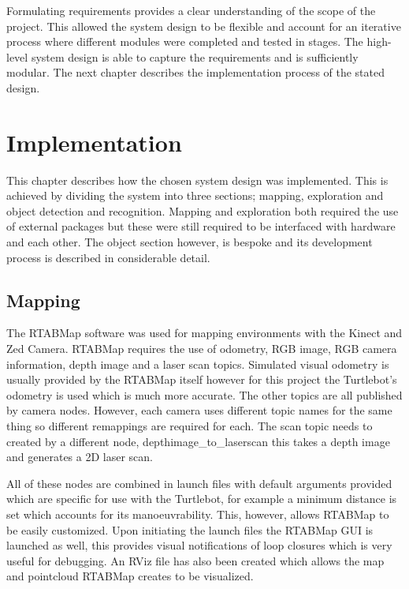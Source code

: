 \documentclass{mproj}
\begin{document}
Formulating requirements provides a clear understanding of the scope of the project. This allowed the system design to be flexible and account for an iterative process where different modules were  completed and tested in stages. The high-level system design is able to capture the requirements and is sufficiently modular. The next chapter describes the implementation process of the stated design.


\chapter{Implementation}

This chapter describes how the chosen system design was implemented. This is  achieved by dividing the system into three sections; mapping, exploration and object detection and recognition. Mapping and exploration both required the use of external packages but these were still required to be interfaced with hardware and each other. The object section however, is bespoke and its development process is described in considerable detail.  

\section{Mapping}

The RTABMap software was used for mapping environments with the Kinect and Zed Camera. RTABMap requires the use of odometry, RGB image, RGB camera information, depth image and a laser scan topics. Simulated visual odometry is usually provided by the RTABMap itself however for this project the Turtlebot's odometry is used which is much more accurate. The other topics are all published by camera nodes. However, each camera uses different topic names for the same thing so different remappings are required for each. The scan topic needs to created by a different node, depthimage\_to\_laserscan this takes a depth image and generates a 2D laser scan. 

All of these nodes are combined in launch files with default arguments provided which are specific for use with the Turtlebot, for example a minimum distance is set which accounts for its manoeuvrability. This, however, allows RTABMap to be easily customized. Upon initiating the launch files the RTABMap GUI is launched as well, this provides visual notifications of loop closures which is very useful for debugging. An RViz file has also been created which allows the map and pointcloud RTABMap creates to be visualized.  
\end{document}
